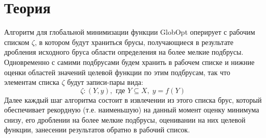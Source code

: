 \documentclass[a4paper]{article}
\begin{document}
\section{Теория}
Алгоритм для глобальной минимизации функции GlobOpt оперирует с рабочим списком $\zeta$, в котором будут храниться брусы, получающиеся в результате дробления исходного бруса области определения на более мелкие подбрусы.\\
Одновременно с самими подбрусами будем хранить в рабочем списке и нижние оценки областей значений целевой функции по этим подбрусам, так что элементам списка $\zeta$ будут записи-пары вида:
\begin{equation}
    \zeta: (Y, y), \text{ где } Y \subseteq X, \; y = f(Y)
\end{equation}
Далее каждый шаг алгоритма состоит в извлечении из этого списка брус, который обеспечивает рекордную (т.е. наименьшую) на данный момент оценку минимума снизу, его дроблении на более мелкие подбрусы, оценивании на них целевой функции, занесении результатов обратно в рабочий список.
\end{document}
